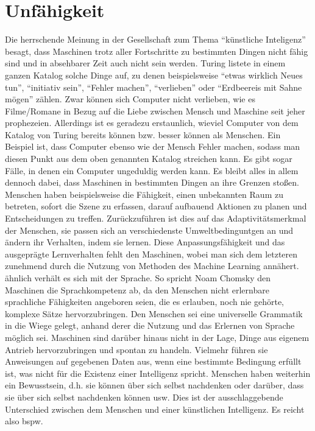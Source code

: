 \section{Unfähigkeit}
Die herrschende Meinung in der Gesellschaft zum Thema “künstliche Inteligenz” besagt, dass Maschinen trotz aller Fortschritte zu bestimmten Dingen nicht fähig sind und in absehbarer Zeit auch nicht sein werden.
Turing listete in einem ganzen Katalog solche Dinge auf, zu denen beispielsweise “etwas wirklich Neues tun”, “initiativ sein”, “Fehler machen”, “verlieben” oder “Erdbeereis mit Sahne mögen” zählen.
Zwar können sich Computer nicht verlieben, wie es Filme/Romane in Bezug auf die Liebe zwischen Mensch und Maschine seit jeher prophezeien.
Allerdings ist es geradezu erstaunlich, wieviel Computer von dem Katalog von Turing bereits können bzw.
besser können als Menschen.
Ein Beispiel ist, dass Computer ebenso wie der Mensch Fehler machen, sodass man diesen Punkt aus dem oben genannten Katalog streichen kann.
Es gibt sogar Fälle, in denen ein Computer ungeduldig werden kann.
Es bleibt alles in allem dennoch dabei, dass Maschinen in bestimmten Dingen an ihre Grenzen stoßen.
Menschen haben beispielsweise die Fähigkeit, einen unbekannten Raum zu betreten, sofort die Szene zu erfassen, darauf aufbauend Aktionen zu planen und Entscheidungen zu treffen.
Zurückzuführen ist dies auf das Adaptivitätsmerkmal der Menschen, sie passen sich an verschiedenste Umweltbedinguntgen an und ändern ihr Verhalten, indem sie lernen.
Diese Anpassungsfähigkeit und das ausgeprägte Lernverhalten fehlt den Maschinen, wobei man sich dem letzteren zunehmend durch die Nutzung von Methoden des Machine Learning annähert.
ähnlich verhält es sich mit der Sprache.
So spricht Noam Chomsky den Maschinen die
Sprachkompetenz ab, da den Menschen nicht erlernbare sprachliche Fähigkeiten angeboren seien, die es erlauben, noch nie gehörte, komplexe Sätze hervorzubringen.
Den Menschen sei eine universelle Grammatik in die Wiege gelegt, anhand derer die Nutzung und das Erlernen von Sprache möglich sei.
Maschinen sind darüber hinaus nicht in der Lage, Dinge aus eigenem Antrieb hervorzubringen und spontan zu handeln.
Vielmehr führen sie Anweisungen auf gegebenen Daten aus, wenn eine bestimmte Bedingung erfüllt ist, was nicht für die Existenz einer Intelligenz spricht.
Menschen haben weiterhin ein Bewusstsein, d.h.
sie können über sich selbst nachdenken oder darüber, dass sie über sich selbst nachdenken können usw.
Dies ist der ausschlaggebende Unterschied zwischen dem Menschen und einer künstlichen Intelligenz.
Es reicht also bspw.
